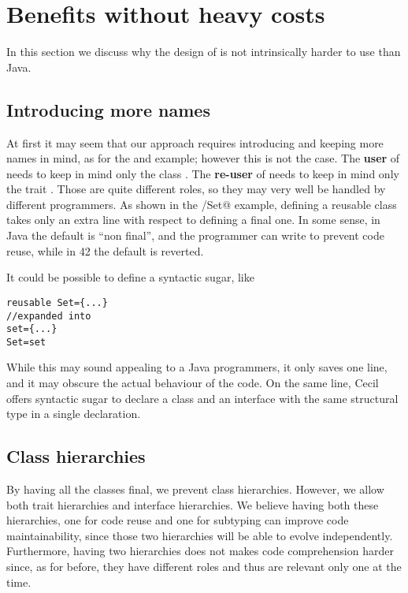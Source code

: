 \newpage\appendix

\section{Benefits without heavy costs}
In this section we discuss why the design of \name
is not intrinsically harder to use than Java.

\subsection{Introducing more names}
At first it may seem that our approach requires
introducing and keeping more names in mind, as for the \Q@set@ and \Q@Set@ example;
however this is not the case. 
The \textbf{user} of \Q@Set@ needs to keep in mind
only the class \Q@Set@.
The \textbf{re-user} of \Q@set@ needs to keep in mind only
 the trait \Q@set@.
Those are quite different roles, so they may very well
be handled by different programmers.
As shown in the \Q@set/Set@ example, defining a reusable class
takes only an extra line with respect to defining a final one.
In some sense, in Java the default is ``non final'', and
the programmer can write \Q@final@ to prevent code reuse, while
in 42 the default is reverted.

It could be possible to define a syntactic sugar, like
\begin{lstlisting}
reusable Set={...}
//expanded into
set={...}
Set=set
\end{lstlisting}
While this may sound appealing to a Java programmers, it only saves one line, and it may obscure the actual behaviour of the code.
On the same line, Cecil~\cite{chambers1995typechecking} offers 
syntactic sugar to declare a class and an interface with the same structural type in a single declaration.

\subsection{Class hierarchies}
By having all the classes final, we prevent class hierarchies.
However,
we allow both trait hierarchies and interface hierarchies.
We believe having both these hierarchies,
one for code reuse and one for subtyping can improve code
maintainability, since those two hierarchies will be able to evolve independently. Furthermore, having two hierarchies does not makes code comprehension harder since, as for before, they have different roles and thus are relevant only one at the time.

